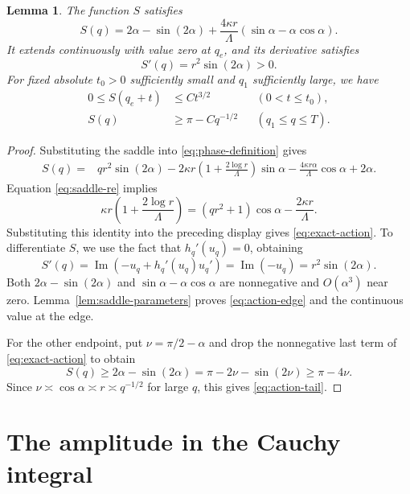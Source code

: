 \documentclass[11pt,reqno]{amsart}
\numberwithin{equation}{section}
\newtheorem{lemma}[theorem]{Lemma}
\renewcommand{\Im}{\operatorname{Im}}
\begin{document}
\begin{lemma}\label{lem:action}
The function $S$ satisfies
\begin{equation}\label{eq:exact-action}
 S(q)=2\alpha-\sin(2\alpha)
      +\frac{4\kappa r}{\Lambda}
                       (\sin\alpha-\alpha\cos\alpha).
\end{equation}
It extends continuously with value zero at $q_e$, and its derivative satisfies
\begin{equation}\label{eq:action-derivative}
 S'(q)=r^2\sin(2\alpha)>0.
\end{equation}
For fixed absolute $t_0>0$ sufficiently small and $q_1$ sufficiently
large, we have
\begin{align}
 0\le S(q_e+t)&\le Ct^{3/2} &&(0<t\le t_0),
                                    \label{eq:action-edge}\\
 S(q)&\ge\pi-Cq^{-1/2} &&(q_1\le q\le T).
                                    \label{eq:action-tail}
\end{align}
\end{lemma}

\begin{proof}
Substituting the saddle into \eqref{eq:phase-definition} gives
\begin{align*}
 S(q)={}&qr^2\sin(2\alpha)
 -2\kappa r\left(1+\frac{2\log r}{\Lambda}\right)\sin\alpha
 -\frac{4\kappa r\alpha}{\Lambda}\cos\alpha+2\alpha.
\end{align*}
Equation \eqref{eq:saddle-re} implies
\[
 \kappa r\left(1+\frac{2\log r}{\Lambda}\right)
 =(qr^2+1)\cos\alpha-\frac{2\kappa r}{\Lambda}.
\]
Substituting this identity into the preceding display gives
\eqref{eq:exact-action}. To differentiate $S$, we use the fact
that $h_q'(u_q)=0$, obtaining
\[
 S'(q)=\Im\left(-u_q+h_q'(u_q)u_q'\right)
       =\Im(-u_q)=r^2\sin(2\alpha).
\]
Both $2\alpha-\sin(2\alpha)$ and
$\sin\alpha-\alpha\cos\alpha$ are nonnegative and
$O(\alpha^3)$ near zero. Lemma~\ref{lem:saddle-parameters} proves
\eqref{eq:action-edge} and the continuous value at the edge.

For the other endpoint, put $\nu=\pi/2-\alpha$ and drop the
nonnegative last term of \eqref{eq:exact-action} to obtain
\[
 S(q)\ge 2\alpha-\sin(2\alpha)
      =\pi-2\nu-\sin(2\nu)\ge\pi-4\nu.
\]
Since $\nu\asymp\cos\alpha\asymp r\asymp q^{-1/2}$ for large
$q$, this gives \eqref{eq:action-tail}.
\end{proof}

\section{The amplitude in the Cauchy integral}\label{sec:amplitude}
\end{document}
